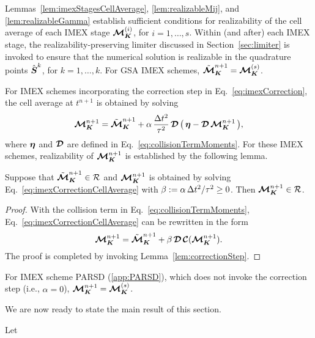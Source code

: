 \begin{rem}
  Lemmas~\ref{lem:imexStagesCellAverage}, \ref{lem:realizableMij}, and \ref{lem:realizableGamma} establish sufficient conditions for realizability of the cell average of each IMEX stage $\boldsymbol{\mathcal{M}}_{\boldsymbol{K}}^{(i)}$, for $i=1,\ldots,s$.  
  Within (and after) each IMEX stage, the realizability-preserving limiter discussed in Section~\ref{sec:limiter} is invoked to ensure that the numerical solution is realizable in the quadrature points $\hat{\boldsymbol{S}}^{k}$, for $k=1,\ldots,k$.  
  For GSA IMEX schemes, $\tilde{\boldsymbol{\mathcal{M}}}_{\boldsymbol{K}}^{n+1}=\boldsymbol{\mathcal{M}}_{\boldsymbol{K}}^{(s)}$.  
\end{rem}

For IMEX schemes incorporating the correction step in Eq.~\eqref{eq:imexCorrection}, the cell average at $t^{n+1}$ is obtained by solving
\begin{equation}
  \boldsymbol{\mathcal{M}}_{\boldsymbol{K}}^{n+1}=\tilde{\boldsymbol{\mathcal{M}}}_{\boldsymbol{K}}^{n+1}+\alpha\,\frac{\Delta t^{2}}{\tau^{2}}\,\boldsymbol{\mathcal{D}}\,\big(\,\boldsymbol{\eta}-\boldsymbol{\mathcal{D}}\,\boldsymbol{\mathcal{M}}_{\boldsymbol{K}}^{n+1}\,\big),
  \label{eq:imexCorrectionCellAverage}
\end{equation}
where $\boldsymbol{\eta}$ and $\boldsymbol{\mathcal{D}}$ are defined in Eq.~\eqref{eq:collisionTermMoments}.  
For these IMEX schemes, realizability of $\boldsymbol{\mathcal{M}}_{\boldsymbol{K}}^{n+1}$ is established by the following lemma.  
\begin{lemma}
  Suppose that $\tilde{\boldsymbol{\mathcal{M}}}_{\boldsymbol{K}}^{n+1}\in\mathcal{R}$ and $\boldsymbol{\mathcal{M}}_{\boldsymbol{K}}^{n+1}$ is obtained by solving Eq.~\eqref{eq:imexCorrectionCellAverage} with $\beta:=\alpha\,\Delta t^{2}/\tau^{2}\ge0$.  
  Then $\boldsymbol{\mathcal{M}}_{\boldsymbol{K}}^{n+1}\in\mathcal{R}$.  
\end{lemma}
\begin{proof}
  With the collision term in Eq.~\eqref{eq:collisionTermMoments}, Eq.~\eqref{eq:imexCorrectionCellAverage} can be rewritten in the form
  \begin{equation*}
    \boldsymbol{\mathcal{M}}_{\boldsymbol{K}}^{n+1}=\tilde{\boldsymbol{\mathcal{M}}}_{\boldsymbol{K}}^{n+1}+\beta\,\boldsymbol{\mathcal{D}}\,\boldsymbol{\mathcal{C}}(\boldsymbol{\mathcal{M}}_{\boldsymbol{K}}^{n+1}).  
  \end{equation*}
  The proof is completed by invoking Lemma~\ref{lem:correctionStep}.  
\end{proof}

\begin{rem}
  For IMEX scheme PARSD (\ref{app:PARSD}), which does not invoke the correction step (i.e., $\alpha=0$), $\boldsymbol{\mathcal{M}}_{\boldsymbol{K}}^{n+1}=\boldsymbol{\mathcal{M}}_{\boldsymbol{K}}^{(s)}$.  
\end{rem}

We are now ready to state the main result of this section.  
\begin{theorem}
  Let
\end{theorem}